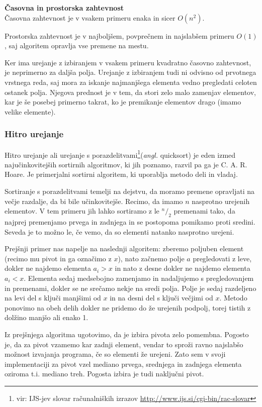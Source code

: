 \documentclass[a4paper,oneside]{article}
\begin{document}
\textbf{Časovna in prostorska zahtevnost} \\
Časovna zahtevnost je v vsakem primeru enaka in sicer $O(n^2)$.

Prostorska zahtevnost je v najboljšem, povprečnem in najslabšem primeru $O(1)$, 
saj algoritem opravlja vse premene na mestu.

Ker ima urejanje z izbiranjem v vsakem primeru kvadratno časovno zahtevnost, je neprimerno
za daljša polja. Urejanje z izbiranjem tudi ni odvisno od prvotnega vrstnega reda,
saj mora za iskanje najmanjšega elementa vedno pregledati celoten ostanek polja.
Njegova prednost je v tem, da stori zelo malo zamenjav elementov, kar je še posebej
primerno takrat, ko je premikanje elementov drago (imamo velike elemente).

\subsubsection{Hitro urejanje}
\label{chapter:quicksort}
Hitro urejanje ali urejanje s porazdelitvami\footnote{vir: IJS-jev slovar računalniških izrazov
\url{http://www.ijs.si/cgi-bin/rac-slovar}}(\emph{angl.} quicksort) je eden izmed
najučinkovitejših sortirnih algoritmov, ki jih poznamo, razvil pa ga je C. A. R. Hoare.
Je primerjalni sortirni algoritem, ki uporablja metodo deli in vladaj.

Sortiranje s porazdelitvami temelji na dejstvu, da moramo premene opravljati na večje
razdalje, da bi bile učinkovitejše. Recimo, da imamo $n$ nasprotno urejenih elementov.
V tem primeru jih lahko sortiramo z le $^n/_2$ premenami tako, da najprej premenjamo prvega
in zadnjega in se postopoma pomikamo proti sredini. Seveda je to možno le, če vemo, da so 
elementi natanko nasprotno urejeni.

Prejšnji primer nas napelje na naslednji algoritem: 
zberemo poljuben element (recimo mu pivot in ga označimo z $x$), nato začnemo 
polje $a$ pregledovati z leve, dokler ne najdemo elementa $a_i > x$ in nato z desne dokler ne 
najdemo elementa $a_i < x$. Elementa sedaj medsebojno zamenjamo in nadaljujemo s 
pregledovanjem in premenami, dokler se ne srečamo nekje na sredi polja.
Polje je sedaj razdeljeno na levi del s ključi manjšimi od $x$ in na desni del
s ključi večjimi od $x$. Metodo ponovimo na obeh delih dokler ne pridemo do že urejenih
podpolj, torej tistih z dolžino manjšo ali enako 1. 

Iz prejšnjega algoritma ugotovimo, da je izbira pivota zelo
pomembna. Pogosto je, da za pivot vzamemo kar zadnji element, vendar to sproži ravno
najslabšo možnost izvajanja programa, če so elementi že urejeni. Zato sem v svoji
implementaciji za pivot vzel mediano prvega, srednjega in zadnjega elementa oziroma t.i.
mediano treh. Pogosta izbira je tudi naključni pivot. 
\end{document}
